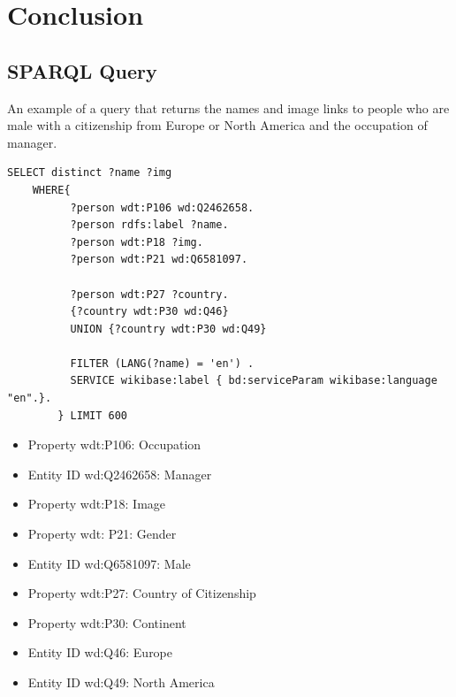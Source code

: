 \documentclass[12pt,english]{article}
\begin{document}
\section{Conclusion}

\begin{appendices}
\section{SPARQL Query}
\label{appen1}
An example of a query that returns the names and image links to people who are male with a citizenship from Europe or North America and the occupation of manager.
 
\begin{verbatim}
SELECT distinct ?name ?img
    WHERE{
          ?person wdt:P106 wd:Q2462658.
          ?person rdfs:label ?name.
          ?person wdt:P18 ?img.
          ?person wdt:P21 wd:Q6581097.
          
          ?person wdt:P27 ?country.
          {?country wdt:P30 wd:Q46} 
          UNION {?country wdt:P30 wd:Q49}
          
          FILTER (LANG(?name) = 'en') .
          SERVICE wikibase:label { bd:serviceParam wikibase:language "en".}.
        } LIMIT 600
\end{verbatim}

\begin{itemize}
\item Property wdt:P106: Occupation
\item Entity ID wd:Q2462658: Manager
\item Property wdt:P18: Image
\item Property wdt: P21: Gender
\item Entity ID wd:Q6581097: Male
\item Property wdt:P27: Country of Citizenship
\item Property wdt:P30: Continent
\item Entity ID wd:Q46: Europe
\item Entity ID wd:Q49: North America
\end{itemize}


\end{appendices}

\nocite{*}

\printbibliography
\end{document}
